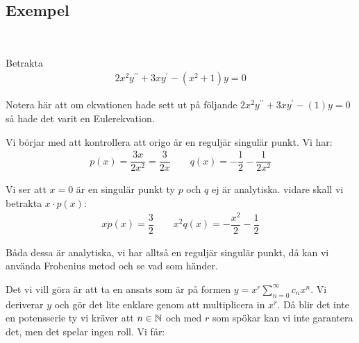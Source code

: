 \subsection{Exempel}\hfill\\
\par\bigskip
\noindent Betrakta 
\begin{equation*}
  \begin{gathered}
    2x^2y^{\prime\prime}+3xy^{\prime}-(x^2+1)y=0
  \end{gathered}
\end{equation*}\par
\noindent Notera här att om ekvationen hade sett ut på följande $2x^2y^{\prime\prime}+3xy^{\prime}-(1)y=0$ så hade det varit en Eulerekvation.\par
\noindent Vi börjar med att kontrollera att origo är en reguljär singulär punkt. Vi har:
\begin{equation*}
  \begin{gathered}
    p(x)=\dfrac{3x}{2x^2}=\dfrac{3}{2x}\qquad q(x)=-\dfrac{1}{2}-\dfrac{1}{2x^2}
  \end{gathered}
\end{equation*}\par
\noindent Vi ser att $x=0$ är en singulär punkt ty $p$ och $q$ ej är analytiska. vidare skall vi betrakta $x\cdot p(x)$:
\begin{equation*}
  \begin{gathered}
    xp(x)=\dfrac{3}{2}\qquad x^2q(x)=-\dfrac{x^2}{2}-\dfrac{1}{2}
  \end{gathered}
\end{equation*}\par
\noindent Båda dessa är analytiska, vi har alltså en reguljär singulär punkt, då kan vi använda Frobenius metod och se vad som händer.
\par\bigskip
\noindent Det vi vill göra är att ta en ansats som är på formen $y=x^r\sum_{n=0}^{\infty}c_nx^n$. Vi deriverar $y$ och gör det lite enklare genom att multiplicera in $x^r$. Då blir det inte en potensserie ty vi kräver att $n\in\mathbb{N}$ och med $r$ som spökar kan vi inte garantera det, men det spelar ingen roll. Vi får:

